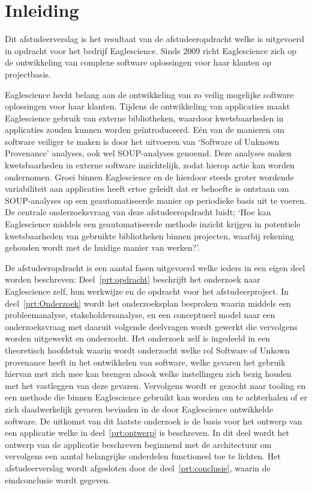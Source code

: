 \chapter{Inleiding}\label{ch:inleiding}
Dit afstudeerverslag is het resultaat van de afstudeeropdracht welke is uitgevoerd in opdracht voor het bedrijf Eaglescience. Sinds 2009 richt Eaglescience zich op de ontwikkeling van complexe software oplossingen voor haar klanten op projectbasis.

Eaglescience hecht belang aan de ontwikkeling van zo veilig mogelijke software oplossingen voor haar klanten. Tijdens de ontwikkeling van applicaties maakt Eaglescience gebruik van externe bibliotheken, waardoor kwetsbaarheden in applicaties zouden kunnen worden geïntroduceerd. Eén van de manieren om software veiliger te maken is door het uitvoeren van ‘Software of Unknown Provenance’ analyses, ook wel SOUP-analyses genoemd. Deze analyses maken kwetsbaarheden in externe software inzichtelijk, zodat hierop actie kan worden ondernomen. Groei binnen Eaglescience en de hierdoor steeds groter wordende variabiliteit aan applicaties heeft ertoe geleidt dat er behoefte is ontstaan om SOUP-analyses op een geautomatiseerde manier op periodieke basis uit te voeren. De centrale onderzoeksvraag van deze afstudeeropdracht luidt; ‘Hoe kan Eaglescience middels een geautomatiseerde methode inzicht krijgen in potentiele kwetsbaarheden van gebruikte bibliotheken binnen projecten, waarbij rekening gehouden wordt met de huidige manier van werken?’.

De afstudeeropdracht is een aantal fasen uitgevoerd welke ieders in een eigen deel worden beschreven:
Deel~\ref{prt:opdracht} beschrijft het onderzoek naar Eaglescience zelf, hun werkwijze en de opdracht voor het afstudeerproject. In deel~\ref{prt:Onderzoek} wordt het onderzoeksplan besproken waarin middels een probleemanalyse, stakeholdersanalyse, en een conceptueel model naar een onderzoeksvraag met daaruit volgende deelvragen wordt gewerkt die vervolgens worden uitgewerkt en onderzocht. Het onderzoek zelf is ingedeeld in een theoretisch hoofdstuk waarin wordt onderzocht welke rol Software of Unkown provenance heeft in het ontwikkelen van software, welke gevaren het gebruik hiervan met zich mee kan brengen alsook welke instellingen zich bezig houden met het vastleggen van deze gevaren. Vervolgens wordt er gezocht naar tooling en een methode die binnen Eaglescience gebruikt kan worden om te achterhalen of er zich daadwerkelijk gevaren bevinden in de door Eaglescience ontwikkelde software. De uitkomst van dit laatste onderzoek is de basis voor het ontwerp van een applicatie welke in deel~\ref{prt:ontwerp} is beschreven. In dit deel wordt het ontwerp van de applicatie beschreven beginnend met de architectuur om vervolgens een aantal belangrijke onderdelen functioneel toe te lichten. Het afstudeerverslag wordt afgesloten door de deel~\ref{prt:conclusie}, waarin de eindconclusie wordt gegeven.


